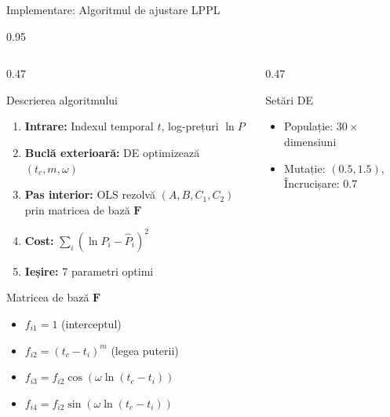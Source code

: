 \documentclass[9pt, aspectratio=169, t]{beamer}
\begin{document}
\begin{frame}{Implementare: Algoritmul de ajustare LPPL}
    \begin{cminipage}{0.95\textwidth}
    {\footnotesize
    \begin{columns}[T]
        \begin{column}{0.47\textwidth}
            \begin{block}{Descrierea algoritmului}
                \begin{enumerate}\setlength{\itemsep}{0pt}
                    \item \textbf{Intrare:} Indexul temporal $t$, log-prețuri $\ln P$
                    \item \textbf{Buclă exterioară:} DE optimizează $(t_c, m, \omega)$
                    \item \textbf{Pas interior:} OLS rezolvă $(A, B, C_1, C_2)$ prin matricea de bază $\mathbf{F}$
                    \item \textbf{Cost:} $\sum_i (\ln P_i - \hat{P}_i)^2$
                    \item \textbf{Ieșire:} 7 parametri optimi
                \end{enumerate}
            \end{block}
            \vspace{-1mm}
            \begin{exampleblock}{Matricea de bază $\mathbf{F}$}
                \begin{itemize}\setlength{\itemsep}{0pt}
                    \item $f_{i1} = 1$ (interceptul)
                    \item $f_{i2} = (t_c - t_i)^m$ (legea puterii)
                    \item $f_{i3} = f_{i2}\cos(\omega\ln(t_c - t_i))$
                    \item $f_{i4} = f_{i2}\sin(\omega\ln(t_c - t_i))$
                \end{itemize}
            \end{exampleblock}
        \end{column}
        \begin{column}{0.47\textwidth}
            \begin{alertblock}{Setări DE}
                \begin{itemize}\setlength{\itemsep}{0pt}
                    \item Populație: $30 \times$ dimensiuni
                    \item Mutație: $(0.5, 1.5)$, Încrucișare: 0.7

\end{itemize}
\end{alertblock}
\end{column}
\end{columns}}
\end{cminipage}
\end{frame}
\end{document}
